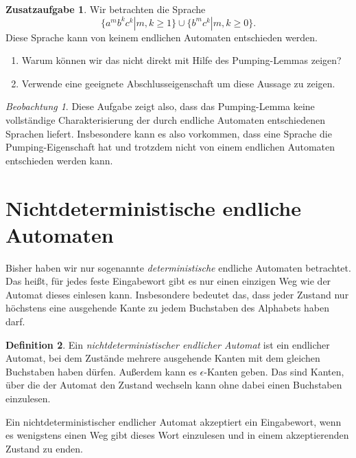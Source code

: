 \documentclass[a4paper,ngerman,12pt]{scrartcl}
\theoremstyle{definition}
\newtheorem{defn}{Definition}[]
\newtheorem{zaufg}{Zusatzaufgabe}
\theoremstyle{plain}
\theoremstyle{remark}
\newtheorem{beob}[defn]{Beobachtung}
\begin{document}
\begin{zaufg}
	Wir betrachten die Sprache
		\[\{a^mb^kc^k | m,k \geq 1\} \cup \{b^mc^k | m,k \geq 0\}.\]
	Diese Sprache kann von keinem endlichen Automaten entschieden werden.
	\begin{enumerate}[label=\alph*)]
		\item Warum können wir das nicht direkt mit Hilfe des Pumping-Lemmas zeigen?
		\item Verwende eine geeignete Abschlusseigenschaft um diese Aussage zu zeigen.
	\end{enumerate}
\end{zaufg}

\begin{beob}
	Diese Aufgabe zeigt also, dass das Pumping-Lemma keine vollständige Charakterisierung der durch endliche Automaten entschiedenen Sprachen liefert. Insbesondere kann es also vorkommen, dass eine Sprache die Pumping-Eigenschaft hat und trotzdem nicht von einem endlichen Automaten entschieden werden kann.
\end{beob}

\section{Nichtdeterministische endliche Automaten}

Bisher haben wir nur sogenannte \emph{deterministische} endliche Automaten betrachtet. Das heißt, für jedes feste Eingabewort gibt es nur einen einzigen Weg wie der Automat dieses einlesen kann. Insbesondere bedeutet das, dass jeder Zustand nur höchstens eine ausgehende Kante zu jedem Buchstaben des Alphabets haben darf.

\begin{defn}
	Ein \emph{nichtdeterministischer endlicher Automat} ist ein endlicher Automat, bei dem Zustände mehrere ausgehende Kanten mit dem gleichen Buchstaben haben dürfen. Außerdem kann es $\epsilon$-Kanten geben. Das sind Kanten, über die der Automat den Zustand wechseln kann ohne dabei einen Buchstaben einzulesen.
	
	Ein nichtdeterministischer endlicher Automat akzeptiert ein Eingabewort, wenn es wenigstens einen Weg gibt dieses Wort einzulesen und in einem akzeptierenden Zustand zu enden.
\end{defn}
\end{document}
